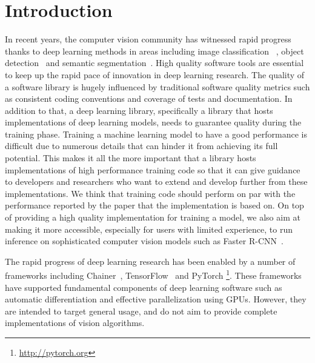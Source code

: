 \documentclass[sigconf]{acmart}
\begin{document}


\maketitle

\section{Introduction}


In recent years, the computer vision community has witnessed rapid progress thanks to deep learning methods in areas including image classification ~\cite{NIPS2012_4824}, object detection~\cite{Ren2015} and semantic segmentation~\cite{badrinarayanan2015segnet}.
High quality software tools are essential to keep up the rapid pace of innovation in deep learning research.
The quality of a software library is hugely influenced by traditional software quality metrics such as consistent coding conventions and coverage of tests and documentation.
In addition to that, a deep learning library, specifically a library that hosts implementations of deep learning models, needs to guarantee quality during the training phase.
Training a machine learning model to have a good performance is difficult due to numerous details that can hinder it from achieving its full potential.
This makes it all the more important that a library hosts implementations of high performance training code so that it can give guidance to developers and researchers who want to extend and develop further from these implementations.
We think that training code should perform on par with the performance reported by the paper that the implementation is based on.
On top of providing a high quality implementation for training a model, we also aim at making it more accessible, especially for users with limited experience, to run inference on sophisticated computer vision models such as Faster R-CNN~\cite{Ren2015}.


The rapid progress of deep learning research has been enabled by a number of frameworks including Chainer~\cite{Tokui2015}, TensorFlow~\cite{tensorflow2015-whitepaper} and PyTorch \footnote{\url{http://pytorch.org}}.
These frameworks have supported fundamental components of deep learning software such as  automatic differentiation and effective parallelization using GPUs.
However, they are intended to target general usage, and do not aim to provide complete implementations of vision algorithms.
\end{document}
